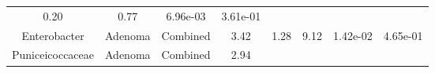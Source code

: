 \documentclass[12pt,]{article}
\begin{document}
\begin{longtable}[]{@{}cccccccc@{}}
\begin{minipage}[t]{0.14\columnwidth}
0.20\strut
\end{minipage} & \begin{minipage}[t]{0.14\columnwidth}\centering\strut
0.77\strut
\end{minipage} & \begin{minipage}[t]{0.06\columnwidth}\centering\strut
6.96e-03\strut
\end{minipage} & \begin{minipage}[t]{0.06\columnwidth}\centering\strut
3.61e-01\strut
\end{minipage}\tabularnewline
\begin{minipage}[t]{0.18\columnwidth}\centering\strut
Enterobacter\strut
\end{minipage} & \begin{minipage}[t]{0.07\columnwidth}\centering\strut
Adenoma\strut
\end{minipage} & \begin{minipage}[t]{0.09\columnwidth}\centering\strut
Combined\strut
\end{minipage} & \begin{minipage}[t]{0.03\columnwidth}\centering\strut
3.42\strut
\end{minipage} & \begin{minipage}[t]{0.14\columnwidth}\centering\strut
1.28\strut
\end{minipage} & \begin{minipage}[t]{0.14\columnwidth}\centering\strut
9.12\strut
\end{minipage} & \begin{minipage}[t]{0.06\columnwidth}\centering\strut
1.42e-02\strut
\end{minipage} & \begin{minipage}[t]{0.06\columnwidth}\centering\strut
4.65e-01\strut
\end{minipage}\tabularnewline
\begin{minipage}[t]{0.18\columnwidth}\centering\strut
Puniceicoccaceae\strut
\end{minipage} & \begin{minipage}[t]{0.07\columnwidth}\centering\strut
Adenoma\strut
\end{minipage} & \begin{minipage}[t]{0.09\columnwidth}\centering\strut
Combined\strut
\end{minipage} & \begin{minipage}[t]{0.03\columnwidth}\centering\strut
2.94\strut
\end{minipage} & \begin{minipage}[t]{0.14\columnwidth}\centering\strut

\end{minipage}
\end{longtable}
\end{document}
